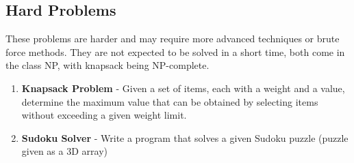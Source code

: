 \documentclass[openany]{book}
\begin{document}
\subsection{Hard Problems}
These problems are harder and may require more advanced techniques or brute force methods. They are not expected to be solved in a short time, both come in the class NP, with knapsack being NP-complete.
\begin{enumerate}
    \item \textbf{Knapsack Problem} - Given a set of items, each with a weight and a value, determine the maximum value that can be obtained by selecting items without exceeding a given weight limit.
    \item \textbf{Sudoku Solver} - Write a program that solves a given Sudoku puzzle (puzzle given as a 3D array)
\end{enumerate}
\end{document}

